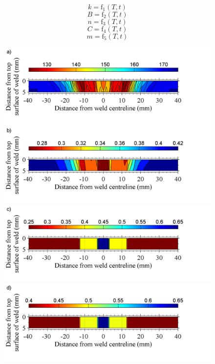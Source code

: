 \begin{equation}
\label{eq3}
k=\text{f}_1(T,t)
\end{equation}
\begin{equation}
\label{eq4}
B=\text{f}_2(T,t)
\end{equation}
\begin{equation}
\label{eq5}
n=\text{f}_3(T,t)
\end{equation}
\begin{equation}
\label{eq6}
C=\text{f}_4(T,t)
\end{equation}
\begin{equation}
\label{eq7}
m=\text{f}_5(T,t)
\end{equation}
\begin{figure}
	\centering
	\includegraphics[width=1\linewidth]{JCHValtered}
	\includegraphics[width=1\linewidth]{JCAaltered}
	\includegraphics[width=1\linewidth]{JCBaltered}
	\includegraphics[width=1\linewidth]{JCnaltered}

\end{figure}

